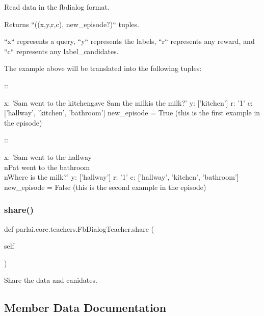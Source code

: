 \begin{DoxyVerb}Read data in the fbdialog format.

Returns ``((x,y,r,c), new_episode?)`` tuples.

``x`` represents a query, ``y`` represents the labels, ``r`` represents
any reward, and ``c`` represents any label_candidates.

The example above will be translated into the following tuples:

::

    x: 'Sam went to the kitchen\nPat gave Sam the milk\nWhere is the milk?'
    y: ['kitchen']
    r: '1'
    c: ['hallway', 'kitchen', 'bathroom']
    new_episode = True (this is the first example in the episode)


::

    x: 'Sam went to the hallway\\nPat went to the bathroom\\nWhere is the
milk?'
    y: ['hallway']
    r: '1'
    c: ['hallway', 'kitchen', 'bathroom']
    new_episode = False (this is the second example in the episode)
\end{DoxyVerb}
 \mbox{\label{classparlai_1_1core_1_1teachers_1_1FbDialogTeacher_a18a4ea7a7f21eeed7e087cb447a37c5a}} 
\subsubsection{\texorpdfstring{share()}{share()}}
{\footnotesize\ttfamily def parlai.\+core.\+teachers.\+Fb\+Dialog\+Teacher.\+share (\begin{DoxyParamCaption}\item[{}]{self }\end{DoxyParamCaption})}

\begin{DoxyVerb}Share the data and canidates.
\end{DoxyVerb}
 

\subsection{Member Data Documentation}
\mbox{\label{classparlai_1_1core_1_1teachers_1_1FbDialogTeacher_a3ec67545250d8a877038667e3f4ea158}} 

